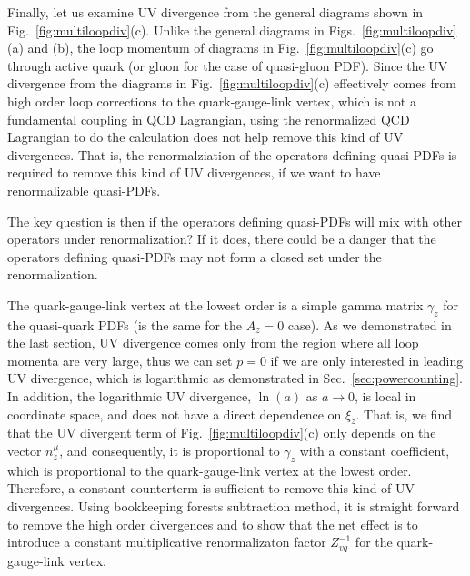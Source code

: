 Finally, let us examine UV divergence from the general diagrams shown in Fig.~\ref{fig:multiloopdiv}(c). Unlike the general diagrams in Figs.~\ref{fig:multiloopdiv}(a) and (b), the loop momentum of diagrams in Fig.~\ref{fig:multiloopdiv}(c) go through active quark (or gluon for the case of quasi-gluon PDF).  Since the UV divergence from the diagrams in Fig.~\ref{fig:multiloopdiv}(c) effectively comes from high order loop corrections to the quark-gauge-link vertex, which is not a fundamental coupling in QCD Lagrangian, using the renormalized QCD Lagrangian to do the calculation does not help remove this kind of UV divergences.  That is, the renormalziation of the operators defining quasi-PDFs is required to remove this kind of UV divergences, if we want to have renormalizable quasi-PDFs.

The key question is then if the operators defining quasi-PDFs will mix with other operators under renormalization? If it does, there could be a danger that the operators defining quasi-PDFs may not form a closed set under the renormalization.

The quark-gauge-link vertex at the lowest order is a simple gamma matrix $\gamma_z$ for the quasi-quark PDFs (is the same for the $A_z=0$ case). As we demonstrated in the last section, UV divergence comes only from the region where all loop momenta are very large, thus we can set $p=0$ if we are only interested in leading UV divergence, which is logarithmic as demonstrated in Sec.~\ref{sec:powercounting}. In addition, the logarithmic UV divergence, $\ln(a)$ as $a\to 0$, is local in coordinate space, and does not have a direct dependence on $\xi_z$.  That is, we find that the UV divergent term of Fig.~\ref{fig:multiloopdiv}(c) only depends on the vector $n_z^\mu$, and consequently, it is proportional to $\gamma_z$ with a constant coefficient, which is proportional to the quark-gauge-link vertex at the lowest order.  Therefore, a constant counterterm is sufficient to remove this kind of UV divergences. Using bookkeeping forests subtraction method, it is straight forward to remove the high order divergences and to show that the net effect is to introduce a constant multiplicative renormalizaton factor $Z_{vq}^{-1}$ for the quark-gauge-link vertex.

